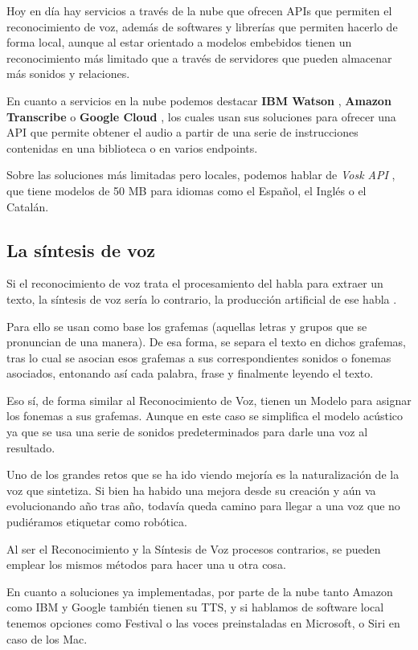 Hoy en día hay servicios a través de la nube que ofrecen APIs que permiten el reconocimiento de voz, además de softwares y librerías que permiten hacerlo de forma local, aunque al estar orientado a modelos embebidos tienen un reconocimiento más limitado que a través de servidores que pueden almacenar más sonidos y relaciones.

En cuanto a servicios en la nube podemos destacar \textbf{IBM Watson} \cite{ibm-sr}, \textbf{Amazon Transcribe} \cite{amazon-transcribe} o \textbf{Google Cloud} \cite{google-stt}, los cuales usan sus soluciones para ofrecer una API que permite obtener el audio a partir de una serie de instrucciones contenidas en una biblioteca o en varios endpoints.

Sobre las soluciones más limitadas pero locales, podemos hablar de \textit{Vosk API} \cite{vosk}, que tiene modelos de 50 MB para idiomas como el Español, el Inglés o el Catalán.


\subsection{La síntesis de voz}
Si el reconocimiento de voz trata el procesamiento del habla para extraer un texto, la síntesis de voz sería lo contrario, la producción artificial de ese habla \cite{tts-definition}. 

Para ello se usan como base los grafemas (aquellas letras y grupos que se pronuncian de una manera). De esa forma, se separa el texto en dichos grafemas, tras lo cual se asocian esos grafemas a sus correspondientes sonidos o fonemas asociados, entonando así cada palabra, frase y finalmente leyendo el texto.

Eso sí, de forma similar al Reconocimiento de Voz, tienen un Modelo para asignar los fonemas a sus grafemas. Aunque en este caso se simplifica el modelo acústico ya que se usa una serie de sonidos predeterminados para darle una voz al resultado.

Uno de los grandes retos que se ha ido viendo mejoría es la naturalización de la voz que sintetiza. Si bien ha habido una mejora desde su creación y aún va evolucionando año tras año, todavía queda camino para llegar a una voz que no pudiéramos etiquetar como robótica.

Al ser el Reconocimiento y la Síntesis de Voz procesos contrarios, se pueden emplear los mismos métodos para hacer una u otra cosa.

En cuanto a soluciones ya implementadas, por parte de la nube tanto Amazon \cite{polly} como IBM \cite{ibm-tts} y Google \cite{google-tts} también tienen su TTS, y si hablamos de software local tenemos opciones como Festival \cite{festival} o las voces preinstaladas en Microsoft, o Siri en caso de los Mac.
 

